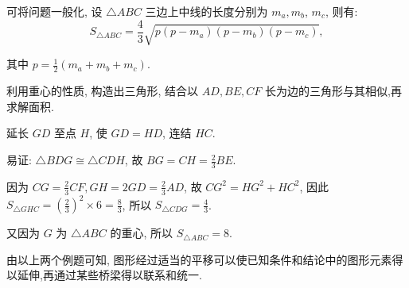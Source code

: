\documentclass{March}
\begin{document}
\begin{note}
	可将问题一般化, 设 $\triangle A B C$ 三边上中线的长度分别为 $m_a, m_b$, $m_c$, 则有:
	$$
		S_{\triangle A B C}=\frac{4}{3} \sqrt{p\left(p-m_a\right)\left(p-m_b\right)\left(p-m_c\right)},
	$$

	其中 $p=\frac{1}{2}\left(m_a+m_b+m_c\right)$.
\end{note}
\begin{solution}[法二]
	利用重心的性质, 构造出三角形, 结合以 $A D ,  B E ,  C F$ 长为边的三角形与其相似,再求解面积.

	延长 $G D$ 至点 $H$, 使 $G D=H D$, 连结 $H C$.

	易证: $\triangle B D G \cong \triangle C D H$, 故 $B G=C H=\frac{2}{3} B E$.

	因为 $C G=\frac{2}{3} C F, G H=2 G D=\frac{2}{3} A D$, 故 $C G^2=H G^2+H C^2$, 因此 $S_{\triangle G H C}=\left(\frac{2}{3}\right)^2 \times 6=\frac{8}{3}$, 所以 $S_{\triangle C D G}=\frac{4}{3}$.

	又因为 $G$ 为 $\triangle A B C$ 的重心, 所以 $S_{\triangle A B C}=8$.
\end{solution}
\begin{note}
	由以上两个例题可知, 图形经过适当的平移可以使已知条件和结论中的图形元素得以延伸,再通过某些桥梁得以联系和统一.
\end{note}
\end{document}
